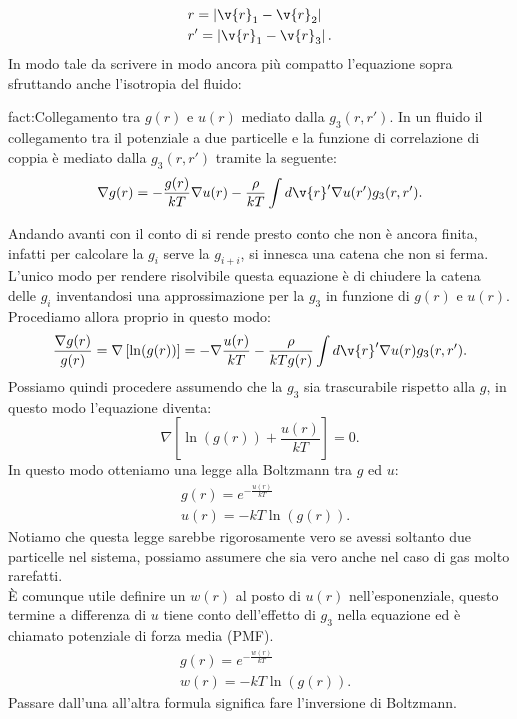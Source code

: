 \[\begin{aligned}
	& r = \left| \v{r}_1-\v{r}_2 \right| \\
	&r' = \left| \v{r}_1-\v{r}_3 \right| 
.\end{aligned}\]
In modo tale da scrivere in modo ancora più compatto l'equazione sopra sfruttando anche l'isotropia del fluido:
\begin{fact}{fact:Collegamento tra $g(r)$ e $u(r)$ mediato dalla $g_3(r,r')$.}
	In un fluido il collegamento tra il potenziale a due particelle e la funzione 
	di correlazione di coppia è mediato dalla $g_3(r,r')$ tramite la seguente:
	\[
	\nabla g(r) = -\frac{g(r)}{kT} \nabla u(r)
	- \frac{\rho }{kT}\int d \v{r}'\nabla u(r')g_3(r,r')
	.\] 
\end{fact}
Andando avanti con il conto di si rende presto conto che non è ancora finita, infatti per calcolare la $g_i$ serve la $g_{i+i}$, si innesca una catena che non si ferma. L'unico modo per rendere risolvibile questa equazione è di chiudere la catena delle $g_i$ inventandosi una approssimazione per la $g_3$ in funzione di $g(r)$ e $u(r)$. Procediamo allora proprio in questo modo:
\[
	\frac{\nabla g(r)}{g(r)}
	=
	\nabla\left[ \ln(g(r)) \right] 
	=
	- \nabla  \frac{u(r)}{kT} 
	-
	\frac{\rho }{kT g(r)} \int d \v{r}' \nabla u(r)g_3(r,r')
.\] 
Possiamo quindi procedere assumendo che la $g_3$ sia trascurabile rispetto alla $g$, in questo modo l'equazione diventa:
\[
	\nabla\left[ \ln(g(r))+\frac{u(r)}{kT} \right] = 0
.\] 
In questo modo otteniamo una legge alla Boltzmann tra $g$ ed $u$:
\[\begin{aligned}
	& g(r) = e^{-\frac{u(r)}{kT}}\\
	& u(r) = - kT\ln (g(r))
.\end{aligned}\]
Notiamo che questa legge sarebbe rigorosamente vero se avessi soltanto due particelle nel sistema, possiamo assumere che sia vero anche nel caso di gas molto rarefatti.\\
È comunque utile definire un $w(r)$ al posto di $u(r)$ nell'esponenziale, questo termine a differenza di $u$ tiene conto dell'effetto di $g_3$ nella equazione ed è chiamato potenziale di forza media (PMF).
\[\begin{aligned}
	& g(r) = e^{-\frac{w(r)}{kT}}\\
	& w(r) = - kT\ln (g(r))
.\end{aligned}\]
Passare dall'una all'altra formula significa fare l'inversione di Boltzmann.
